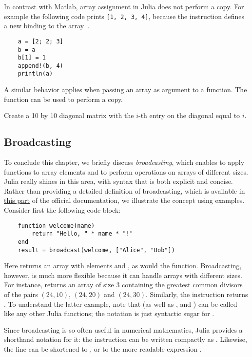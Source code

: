 In contrast with Matlab,
array assignment in Julia does not perform a copy.
For example the following code prints \texttt{[1, 2, 3, 4]},
because the instruction  defines a new binding to the array~.
\begin{verbatim}
    a = [2; 2; 3]
    b = a
    b[1] = 1
    append!(b, 4)
    println(a)
\end{verbatim}
A similar behavior applies when passing an array as argument to a function.
The  function can be used to perform a copy.

\begin{task}
    Create a 10 by 10 diagonal matrix with the $i$-th entry on the diagonal equal to $i$.
\end{task}

\subsection*{Broadcasting}%
\label{sub:broadcasting}
To conclude this chapter,
we briefly discuss \emph{broadcasting},
which enables to apply functions to array elements and to perform operations on arrays of different sizes.
Julia really shines in this area,
with syntax that is both explicit and concise.
Rather than providing a detailed definition of broadcasting,
which is available in \href{https://docs.julialang.org/en/v1/manual/arrays/#Broadcasting}{this part} of the official documentation,
we illustrate the concept using examples.
Consider first the following code block:
\begin{verbatim}
    function welcome(name)
        return "Hello, " * name * "!"
    end
    result = broadcast(welcome, ["Alice", "Bob"])
\end{verbatim}
Here  returns an array with elements  and ,
as would the  function.
Broadcasting, however, is much more flexible because it can handle arrays with different sizes.
For instance,  returns an array of size 3 containing the greatest common divisors of the pairs $(24, 10)$, $(24, 20)$ and $(24, 30)$.
Similarly, the instruction  returns \julia{[2, 3, 4]}.
To understand the latter example, note that \julia{+} (as well as \julia{*}, \julia{-} and \julia{/}) can be called like any other Julia functions;
the notation  is just syntactic sugar for .

Since broadcasting is so often useful in numerical mathematics,
Julia provides a shorthand notation for it: the instruction 
can be written compactly as .
Likewise, the line  can be shortened to ,
or to the more readable expression .

